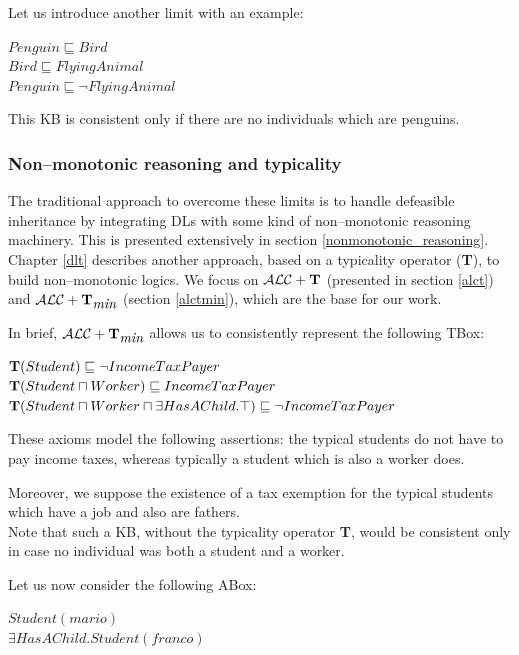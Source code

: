 \documentclass[a4paper, 11pt, oneside]{duthesis}
\newcommand{\tip}{{\bf T}}
\newcommand{\alct}{\mathcal{ALC}+\tip}
\newcommand{\alctmin}{\mathcal{ALC}+\tip_{\mbox{\em min}}}
\begin{document}
Let us introduce another limit with an example:
\begin{center}
$Penguin \sqsubseteq Bird$\\
$Bird \sqsubseteq FlyingAnimal$\\
$Penguin \sqsubseteq \neg FlyingAnimal$
\end{center}
This KB is consistent only if there are no individuals which are penguins.

\subsubsection{Non--monotonic reasoning and typicality}

The traditional approach to overcome these limits is to handle defeasible inheritance by integrating DLs with some kind of non--monotonic reasoning machinery. This is presented extensively in section \ref{nonmonotonic_reasoning}.\\[0.3cm]
Chapter \ref{dlt} describes another approach, based on a typicality operator (\tip), to build non--monotonic logics. We focus on $\alct$ (presented in section \ref{alct}) and $\alctmin$ (section \ref{alctmin}), which are the base for our work.

In brief, $\alctmin$ allows us to consistently represent the following TBox:
\begin{center}
$\tip(Student) \sqsubseteq \neg IncomeTaxPayer$\\
$\tip(Student \sqcap Worker) \sqsubseteq IncomeTaxPayer$\\
$\tip(Student \sqcap Worker \sqcap \exists HasAChild.\top) \sqsubseteq \neg IncomeTaxPayer$
\end{center}
These axioms model the following assertions: the typical students do not have to pay income taxes, whereas typically a student which is also a worker does.

Moreover, we suppose the existence of a tax exemption for the typical students which have a job and also are fathers.\\[0.3cm]
Note that such a KB, without the typicality operator \tip, would be consistent only in case no individual was both a student and a worker.

\newpage

Let us now consider the following ABox:
\begin{center}$Student(mario)$\\
$\exists HasAChild.Student(franco)$\end{center}
\end{document}
